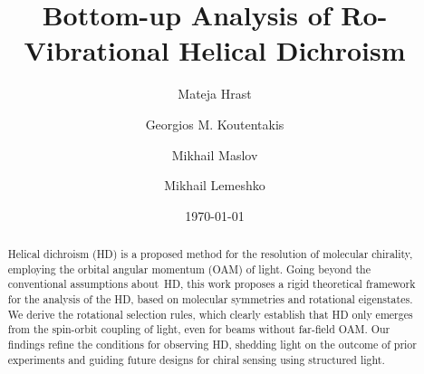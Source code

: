 \documentclass[reprint,aps,prl,twocolumn,superscriptaddress,groupedaddress]{revtex4-2}
\begin{document}
\title{Bottom-up Analysis of Ro-Vibrational Helical Dichroism}

\author{Mateja Hrast}
\author{Georgios M. Koutentakis}
\author{Mikhail Maslov}
\author{Mikhail Lemeshko}

\date{\today}

\begin{abstract}
Helical dichroism (HD) is a proposed method for the resolution of molecular chirality, employing the orbital angular momentum (OAM) of light. Going beyond the conventional assumptions about~HD, this work proposes a rigid theoretical framework for the analysis of the HD, based on molecular symmetries and rotational eigenstates. We derive the rotational selection rules, which clearly establish that HD only emerges from the spin-orbit coupling of light, even for beams without far-field OAM. Our findings refine the conditions for observing HD, shedding light on the outcome of prior experiments and guiding future designs for chiral sensing using structured light.

\end{abstract}

\maketitle

\end{document}
